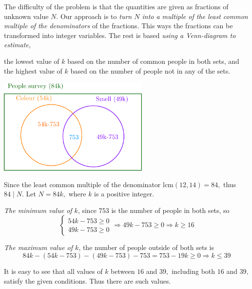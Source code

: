 \documentclass{article}
\begin{document}
\begin{soln}
    The difficulty of the problem is that the quantities are given as fractions of unknown value $N.$
    Our approach is to \textit{turn $N$ into a multiple of the least common multiple of the denominators} of the fractions.
    This ways the fractions can be transformed into integer variables.
    The rest is based \textit{using a Venn-diagram to estimate},
    \begin{enumerate}[topsep=0pt, partopsep=0pt, itemsep=0pt]
        \ii the lowest value of $k$ based on the number of common people in both sets, and
        \ii the highest value of $k$ based on the number of people not in any of the sets.
    \end{enumerate}

    \begin{center}
        \includegraphics[width=7.5cm]{./asy/pdf/gauss-g8-2014-25.pdf}
    \end{center}

    Since the least common multiple of the denominator $\text{lcm}(12,14)=84,$ thus $84 \mid N.$
    Let $N=84k,$ where $k$ is a positive integer.

    \textit{The minimum value of $k$}, since $753$ is the number of people in both sets, so
    \[
        \begin{cases}
            54k - 753 \ge 0\\
            49k - 753 \ge 0
        \end{cases}
        \Rightarrow 49k - 753 \ge 0 \Rightarrow k \ge 16
    \]

    \textit{The maximum value of $k$}, the number of people outside of both sets is
    \[
        84k - (54k - 753) - (49k - 753) - 753 = 753 - 19k \ge 0 \Rightarrow k \le 39
    \]

    It is easy to see that all values of $k$ between $16$ and $39,$ including both $16$ and $39,$ satisfy the given conditions.
    Thus there are  such values.
\end{soln}
\end{document}
